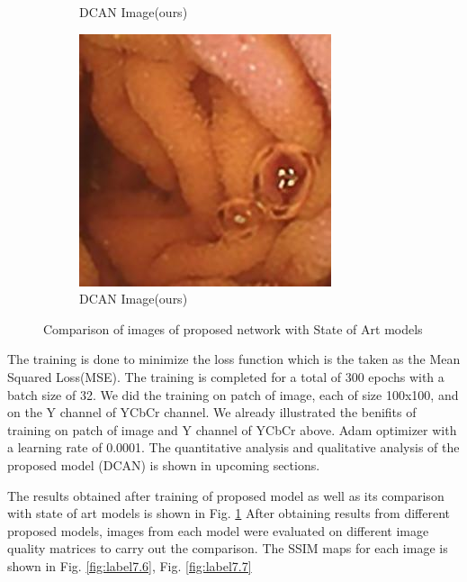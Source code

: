 \begin{figure}[H]
\begin{subfigure}[b]{0.275\textwidth}
    \caption{DCAN Image(ours)}
  \end{subfigure}
  \begin{subfigure}[b]{0.275\textwidth}
    \includegraphics[width=\textwidth]{Chapter7/DCAN_456.jpg}
    \caption{DCAN Image(ours)}
  \end{subfigure}
  
  \caption{Comparison of images of proposed network with State of Art models}
  \label{fig:DCAN}
\end{figure}

The training is done to minimize the loss function which is the taken as the Mean Squared Loss(MSE). The training is completed for a total of 300 epochs with a batch size of 32. We did the training on patch of image, each of size 100x100, and on the Y channel of YCbCr channel. We already illustrated the benifits of training on patch of image and Y channel of YCbCr above. Adam optimizer with a learning rate of 0.0001. The quantitative analysis and qualitative analysis of the proposed model (DCAN) is shown in upcoming sections.


The results obtained after training of proposed model as well as its comparison with state of art models is shown in Fig. \ref{fig:DCAN} After obtaining results from different proposed models, images from each model were evaluated on different image quality matrices to carry out the comparison.
The SSIM maps for each image is shown in Fig. \ref{fig:label7.6}, Fig. \ref{fig:label7.7}

